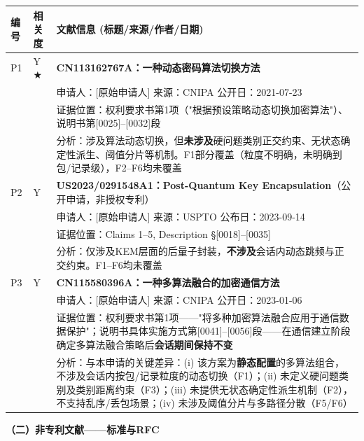 \documentclass[12pt,a4paper]{article}
\begin{document}
\begin{longtable}{|p{1.2cm}|p{1.8cm}|p{11.6cm}|}
\hline
\textbf{编号} & \textbf{相关度} & \textbf{文献信息 (标题/来源/作者/日期)} \\
\hline

P1 & Y ★ & \textbf{CN113162767A：一种动态密码算法切换方法} \\
& & 申请人：[原始申请人] \quad 来源：CNIPA \quad 公开日：2021-07-23 \\
& & 证据位置：权利要求书第1项（"根据预设策略动态切换加密算法"）、说明书第[0025]--[0032]段 \\
& & 分析：涉及算法动态切换，但\textbf{未涉及}硬问题类别正交约束、无状态确定性派生、阈值分片等机制。F1部分覆盖（粒度不明确，未明确到包/记录级），F2--F6均未覆盖 \\
\hline
P2 & Y & \textbf{US2023/0291548A1：Post-Quantum Key Encapsulation}（公开申请，非授权专利） \\
& & 申请人：[原始申请人] \quad 来源：USPTO \quad 公布日：2023-09-14 \\
& & 证据位置：Claims 1--5, Description §[0018]--[0035] \\
& & 分析：仅涉及KEM层面的后量子封装，\textbf{不涉及}会话内动态跳频与正交约束。F1--F6均未覆盖 \\
\hline
P3 & Y & \textbf{CN115580396A：一种多算法融合的加密通信方法} \\
& & 申请人：[原始申请人] \quad 来源：CNIPA \quad 公开日：2023-01-06 \\
& & 证据位置：权利要求书第1项——"将多种加密算法融合应用于通信数据保护"；说明书具体实施方式第[0041]--[0056]段——在通信建立阶段确定多算法融合策略后\textbf{会话期间保持不变} \\
& & 分析：与本申请的关键差异：(i) 该方案为\textbf{静态配置}的多算法组合，不涉及会话内按包/记录粒度的动态切换（F1）；(ii) 未定义硬问题类别及类别距离约束（F3）；(iii) 未提供无状态确定性派生机制（F2），不支持乱序/丢包场景；(iv) 未涉及阈值分片与多路径分散（F5/F6） \\
\hline
\end{longtable}

\textbf{（二）非专利文献——标准与RFC}
\end{document}
